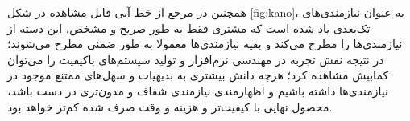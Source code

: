 همچنین در مرجع
\cite{sauerwein_kano_1996}
از خط آبی قابل مشاهده در شکل
\ref{fig:kano}،
به عنوان نیازمندی‌های تک‌بعدی یاد شده است که مشتری فقط به طور صریح و مشخص، این دسته از نیازمندی‌ها را مطرح می‌کند و بقیه نیازمندی‌ها معمولا به طور ضمنی مطرح می‌شوند؛ در نتیجه نقش تجربه در مهندسی نرم‌افزار و تولید سیستم‌های باکیفیت را می‌توان کمابیش مشاهده کرد؛ هرچه دانش بیشتری به بدیهیات و سهل‌های ممتنع موجود در نیازمندی‌ها داشته باشیم و اظهارمندی نیازمندی شفاف و مدون‌تری در دست باشد، محصول نهایی با کیفیت‌تر و هزینه و وقت صرف شده کم‌تر خواهد بود.\\
\begin{figure}[H]
	\centering
	\hspace{0mm}
\end{figure}
